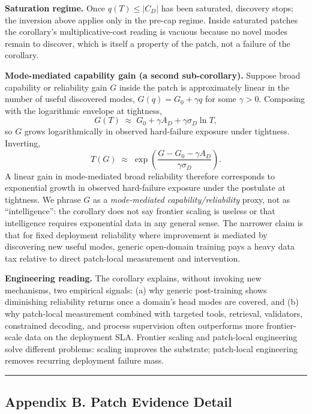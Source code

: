 \documentclass[
]{article}
\begin{document}
\textbf{Saturation regime.} Once \(q(T) \leq |C_D|\) has been saturated,
discovery stops; the inversion above applies only in the pre-cap regime.
Inside saturated patches the corollary's multiplicative-cost reading is
vacuous because no novel modes remain to discover, which is itself a
property of the patch, not a failure of the corollary.

\textbf{Mode-mediated capability gain (a second sub-corollary).} Suppose
broad capability or reliability gain \(G\) inside the patch is
approximately linear in the number of useful discovered modes,
\(G(q) = G_0 + \gamma q\) for some \(\gamma > 0\). Composing with the
logarithmic envelope at tightness, \[
G(T) \;\approx\; G_0 + \gamma A_D + \gamma \sigma_D \ln T,
\] so \(G\) grows logarithmically in observed hard-failure exposure
under tightness. Inverting, \[
T(G) \;\approx\; \exp\!\left(\frac{G - G_0 - \gamma A_D}{\gamma \sigma_D}\right).
\] A linear gain in mode-mediated broad reliability therefore
corresponds to exponential growth in observed hard-failure exposure
under the postulate at tightness. We phrase \(G\) as a
\emph{mode-mediated capability/reliability} proxy, not as
``intelligence'': the corollary does not say frontier scaling is useless
or that intelligence requires exponential data in any general sense. The
narrower claim is that for fixed deployment reliability where
improvement is mediated by discovering new useful modes, generic
open-domain training pays a heavy data tax relative to direct
patch-local measurement and intervention.

\textbf{Engineering reading.} The corollary explains, without invoking
new mechanisms, two empirical signals: (a) why generic post-training
shows diminishing reliability returns once a domain's head modes are
covered, and (b) why patch-local measurement combined with targeted
tools, retrieval, validators, constrained decoding, and process
supervision often outperforms more frontier-scale data on the deployment
SLA. Frontier scaling and patch-local engineering solve different
problems: scaling improves the substrate; patch-local engineering
removes recurring deployment failure mass.

\begin{center}\rule{0.5\linewidth}{0.5pt}\end{center}

\subsection{Appendix B. Patch Evidence
Detail}\label{appendix-b.-patch-evidence-detail}
\end{document}
